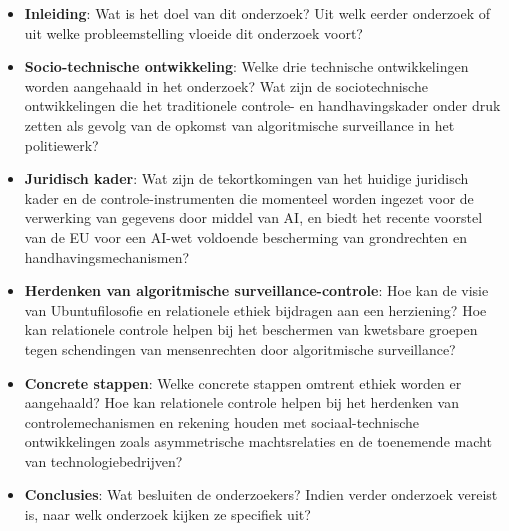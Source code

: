 \documentclass{report}
\begin{document}
	\begin{itemize}
		\item \textbf{Inleiding}: Wat is het doel van dit onderzoek? Uit welk eerder onderzoek of uit welke probleemstelling vloeide dit onderzoek voort?
		\item \textbf{Socio-technische ontwikkeling}: Welke drie technische ontwikkelingen worden aangehaald in het onderzoek? Wat zijn de sociotechnische ontwikkelingen die het traditionele controle- en handhavingskader onder druk zetten als gevolg van de opkomst van algoritmische surveillance in het politiewerk?
		\item \textbf{Juridisch kader}: Wat zijn de tekortkomingen van het huidige juridisch kader en de controle-instrumenten die momenteel worden ingezet voor de verwerking van gegevens door middel van AI, en biedt het recente voorstel van de EU voor een AI-wet voldoende bescherming van grondrechten en handhavingsmechanismen?
		\item \textbf{Herdenken van algoritmische surveillance-controle}: Hoe kan de visie van Ubuntufilosofie en relationele ethiek bijdragen aan een herziening? Hoe kan relationele controle helpen bij het beschermen van kwetsbare groepen tegen schendingen van mensenrechten door algoritmische surveillance?
		\item \textbf{Concrete stappen}: Welke concrete stappen omtrent ethiek worden er aangehaald? Hoe kan relationele controle helpen bij het herdenken van controlemechanismen en rekening houden met sociaal-technische ontwikkelingen zoals asymmetrische machtsrelaties en de toenemende macht van technologiebedrijven?
		\item \textbf{Conclusies}: Wat besluiten de onderzoekers? Indien verder onderzoek vereist is, naar welk onderzoek kijken ze specifiek uit?
	\end{itemize} 
	
\end{document}
